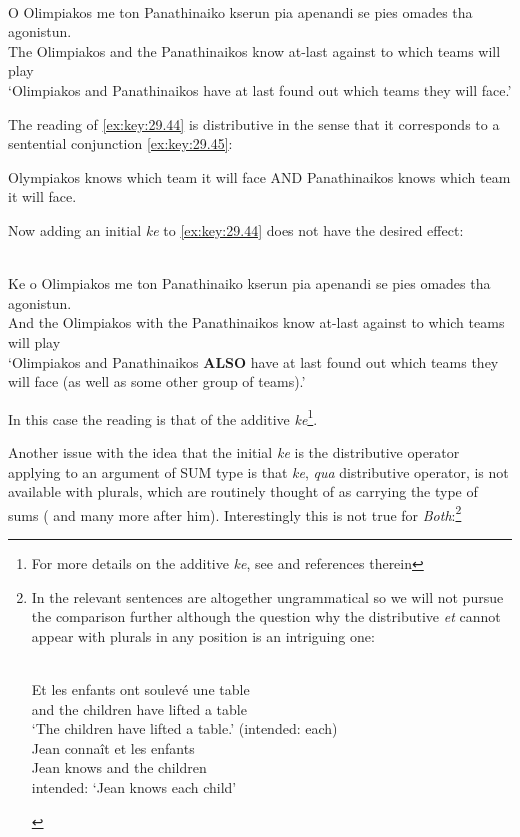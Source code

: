 \documentclass[output=paper]{langsci/langscibook}
\begin{document}
\ea\label{ex:key:29.44} \\
	\gll    O Olimpiakos me ton Panathinaiko kserun pia apenandi se pies omades
    tha agonistun.\\
            The Olimpiakos and the Panathinaikos know at-last against to which teams will play\\
    \glt    \enquote*{Olimpiakos and Panathinaikos have at last found out which
    teams they will face.}
\z

The reading of \eqref{ex:key:29.44} is distributive in the sense that it
corresponds to a sentential conjunction \eqref{ex:key:29.45}:

\ea\label{ex:key:29.45}
    Olympiakos knows which team it will face AND Panathinaikos knows which team
    it will face.
\z

Now adding an initial \emph{ke} to \eqref{ex:key:29.44} does not have the
desired effect:

\ea\label{ex:key:29.46} \\
	\gll    Ke o Olimpiakos me ton Panathinaiko kserun pia apenandi se pies
    omades tha agonistun.\\
            And the Olimpiakos with the Panathinaikos know at-last against to which teams will play\\
    \glt    \enquote*{Olimpiakos and Panathinaikos \textbf{ALSO} have at last
    found out which teams they will face (as well as some other group of
teams).}
\z

In this case the reading is that of the additive \emph{ke}\footnote{For more
details on the additive \emph{ke}, see \citet{cms:15} and references therein}.

Another issue with the idea that the initial \emph{ke} is the distributive
operator applying to an argument of SUM type is that \emph{ke}, \emph{qua}
distributive operator, is not available with plurals, which are routinely
thought of as carrying the type of sums (\cite{link2} and many more after him).
Interestingly this is not true for  \emph{Both}:\footnote{In
     the relevant sentences are altogether ungrammatical so we will
    not pursue the comparison further although the question why the
    distributive \emph{et} cannot appear with plurals in any position is an
    intriguing one:

\begin{exe}\label{ex:key:29.47}
     \\
    \gll     \llap{*}Et les enfants ont soulev\'{e} une table\\
             and the children have lifted a table\\
    \glt     \enquote*{The children have lifted a table.} (intended: each)
%
     \label{ex:key:29.48}\\
    \gll     \llap{*}Jean conna\^{i}t et les enfants\\
             Jean knows and the children \\
    \glt     intended: \enquote*{Jean knows each child}
\end{exe}}
\end{document}
